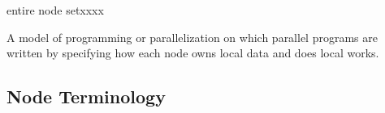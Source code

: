 \begin{namelist}{entire node setxxxx}

 A model of programming or parallelization on which parallel programs
 are written by specifying how each node owns local data and does local
 works.


%

\end{namelist}


\subsection{Node Terminology}

